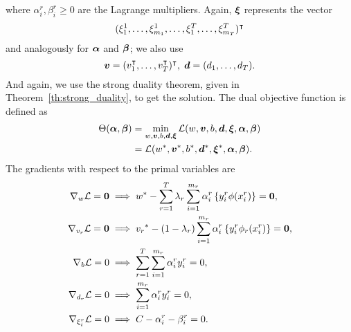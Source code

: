 where $\alpha_i^r, \beta_i^r \geq 0$ are the Lagrange multipliers. Again, $\bm{\xi}$ represents the vector $$(\xi_1^1, \ldots, \xi_{m_1}^1, \ldots, \xi_1^T, \ldots, \xi_{m_T}^T)^\intercal$$ and analogously for $\bm{\alpha}$ and $\bm{\beta}$; we also use 
$$ \bm{v} = (v_1^\intercal, \ldots, v_T^\intercal)^\intercal,\; \bm{d} = (d_1, \ldots, d_T).$$
And again, we use the strong duality theorem, given in Theorem~\ref{th:strong_duality}, to get the solution.
The dual objective function is defined as 
\begin{equation}\nonumber
    \begin{aligned}
         \Theta(\bm{\alpha}, \bm{\beta}) &=  \min_{{w}, \bm{v}, b, \bm{d}, \bm{\xi}} \mathcal{L}({w}, \bm{v}, b, \bm{d}, \bm{\xi}, \bm{\alpha}, \bm{\beta}) \\
         &= \mathcal{L}({{w}}^*, {\bm{v}}^*, {b}^*, {\bm{d}}^*, {\bm{\xi}}^*, \bm{\alpha}, \bm{\beta}) .
    \end{aligned}    
\end{equation}
The gradients with respect to the primal variables are
\begin{align}
    \grad_{{w}} \lagr  = \fv{0}  &\implies \optim{{w}} - \sum_{r= 1}^\ntasks \lambda_r \sum_{i=1}^{m_r} {\alpha_i^r} \left\lbrace y_i^r \phi(x_i^r) \right\rbrace = \fv{0} , \label{eq:common_repr_conv} \\
    \grad_{{v}_r} \lagr  = \fv{0} &\implies \optim{{v}_r} - (1 - \lambda_r) \sum_{i=1}^{m_r} {\alpha_i^r} \left\lbrace y_i^r \phi_r(x_i^r) \right\rbrace = \fv{0} , \label{eq:specific_repr_conv} \\
    \grad_{b} \lagr  = 0  &\implies \sum_{r= 1}^T \sum_{i=1}^{m_r} {\alpha_i^r} y_i^r = 0 , \label{eq:specific_eqconstr_conv}  \\
    \grad_{{d}_r} \lagr  = 0 &\implies \sum_{i=1}^{m_r} {\alpha_i^r} y_i^r = 0 , \label{eq:common_eqconstr_conv} \\
    \grad_{\xi_i^r} \lagr  = 0 &\implies C - {\alpha_i^r} - {\beta_i^r} = 0 . \label{eq:xi_feas_conv}
\end{align}

